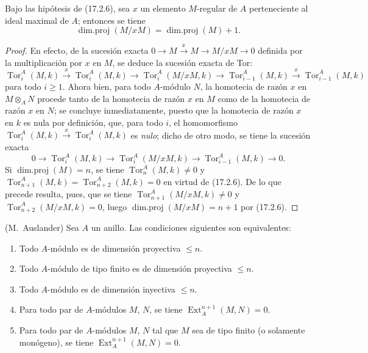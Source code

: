 \begin{corollary}[17.2.7]
\label{0.17.2.7-es}
Bajo las hipótesis de \textup{(17.2.6)}, sea $x$ un elemento $M$-regular de $A$
perteneciente al ideal maximal de $A$; entonces se tiene
\begin{equation}
\label{0.17.2.7.1-es}
\tag{17.2.7.1}
  \operatorname{dim.proj}(M/xM)=\operatorname{dim.proj}(M)+1.
\end{equation}
\end{corollary}

\begin{proof}
En efecto, de la sucesión exacta
$0\longrightarrow M\xrightarrow{x}M\longrightarrow M/xM\longrightarrow0$
definida por la multiplicación por $x$ en $M$, se deduce la sucesión exacta de
Tor:
\[
  \operatorname{Tor}^A_i(M,k)\xrightarrow{x}
  \operatorname{Tor}^A_i(M,k)\longrightarrow
  \operatorname{Tor}^A_i(M/xM,k)\longrightarrow
  \operatorname{Tor}^A_{i-1}(M,k)\xrightarrow{x}
  \operatorname{Tor}^A_{i-1}(M,k)
\]
para todo $i\geq1$. Ahora bien, para todo $A$-módulo $N$, la homotecia de razón $x$
en $M\otimes_A N$ procede tanto de la homotecia de razón $x$ en
$M$ como de la homotecia de razón $x$ en $N$; se concluye inmediatamente,
puesto que la homotecia de razón $x$ en $k$ es nula por definición, que,
para todo $i$, el homomorfismo
$\operatorname{Tor}^A_i(M,k)\xrightarrow{x}\operatorname{Tor}^A_i(M,k)$ es
\emph{nulo}; dicho de otro modo, se tiene la sucesión exacta
\[
  0\longrightarrow\operatorname{Tor}^A_i(M,k)\longrightarrow
  \operatorname{Tor}^A_i(M/xM,k)\longrightarrow
  \operatorname{Tor}^A_{i-1}(M,k)\longrightarrow0.
\]
Si $\operatorname{dim.proj}(M)=n$, se tiene
$\operatorname{Tor}^A_n(M,k)\neq0$ y
$\operatorname{Tor}^A_{n+1}(M,k)=\operatorname{Tor}^A_{n+2}(M,k)=0$ en virtud
de (17.2.6). De lo que precede resulta, pues, que se tiene
$\operatorname{Tor}^A_{n+1}(M/xM,k)\neq0$ y
$\operatorname{Tor}^A_{n+2}(M/xM,k)=0$, luego
$\operatorname{dim.proj}(M/xM)=n+1$ por (17.2.6).
\end{proof}

\begin{proposition}[17.2.8]
\label{0.17.2.8-es}
\textnormal{(M.~Auslander)} Sea $A$ un anillo. Las condiciones siguientes son
equivalentes:
\begin{enumerate}
  \item[\rm a)] Todo $A$-módulo es de dimensión proyectiva $\leq n$.
  \item[\rm a')] Todo $A$-módulo de tipo finito es de dimensión proyectiva
  $\leq n$.
  \item[\rm b)] Todo $A$-módulo es de dimensión inyectiva $\leq n$.
  \item[\rm c)] Para todo par de $A$-módulos $M$, $N$, se tiene
  $\operatorname{Ext}^{n+1}_A(M,N)=0$.
  \item[\rm c')] Para todo par de $A$-módulos $M$, $N$ tal que $M$ sea de
  tipo finito \textup{(o solamente} monógeno\textup{)}, se tiene
  $\operatorname{Ext}^{n+1}_A(M,N)=0$.
\end{enumerate}
\end{proposition}

